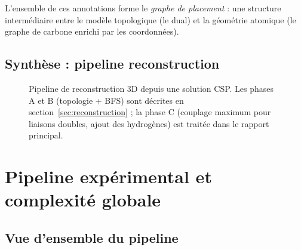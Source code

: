 \documentclass[12pt,a4paper]{article}
\theoremstyle{definition}
\theoremstyle{remark}
\newcommand{\GD}{G_{\!D}}
\newcommand{\VD}{V_{\!D}}
\begin{document}
L'ensemble de ces annotations forme le \emph{graphe de placement} : une
structure interm\'ediaire entre le mod\`ele topologique (le dual) et la
g\'eom\'etrie atomique (le graphe de carbone enrichi par les
coordonn\'ees).

\subsection{Synth\`ese : pipeline reconstruction}

\begin{figure}[!ht]
\centering
{}
\caption{Pipeline de reconstruction 3D depuis une solution CSP. Les
phases A et B (topologie + BFS) sont d\'ecrites en
section~\ref{sec:reconstruction} ; la phase C (couplage maximum pour
liaisons doubles, ajout des hydrog\`enes) est trait\'ee dans le rapport
principal.}
\label{fig:reconstruction-pipeline}
\end{figure}

\section{Pipeline exp\'erimental et complexit\'e globale}
\label{sec:pipeline}

\subsection{Vue d'ensemble du pipeline}
\end{document}
